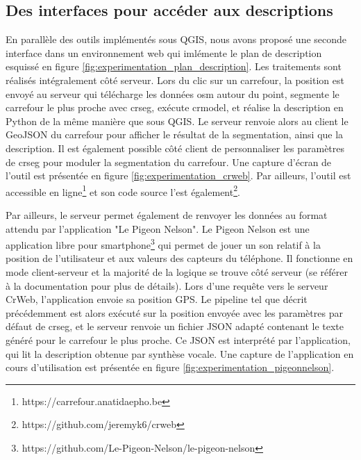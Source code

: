 \subsection{Des interfaces pour accéder aux descriptions}


En parallèle des outils implémentés sous QGIS, nous avons proposé une seconde interface dans un environnement web qui imlémente le plan de description esquissé en figure \ref{fig:experimentation_plan_description}. Les traitements sont réalisés intégralement côté serveur. Lors du clic sur un carrefour, la position est envoyé au serveur qui télécharge les données \gls{osm} autour du point, segmente le carrefour le plus proche avec crseg, exécute crmodel, et réalise la description en Python de la même manière que sous QGIS. Le serveur renvoie alors au client le GeoJSON du carrefour pour afficher le résultat de la segmentation, ainsi que la description. Il est également possible côté client de personnaliser les paramètres de crseg pour moduler la segmentation du carrefour. Une capture d'écran de l'outil est présentée en figure \ref{fig:experimentation_crweb}. Par ailleurs, l'outil est accessible en ligne\footnote{https://carrefour.anatidaepho.be} et son code source l'est également\footnote{https://github.com/jeremyk6/crweb}.

\newpar{}


Par ailleurs, le serveur permet également de renvoyer les données au format attendu par l'application "Le Pigeon Nelson". Le Pigeon Nelson est une application libre pour smartphone\footnote{https://github.com/Le-Pigeon-Nelson/le-pigeon-nelson} qui permet de jouer un son relatif à la position de l'utilisateur et aux valeurs des capteurs du téléphone. Il fonctionne en mode client-serveur et la majorité de la logique se trouve côté serveur (se référer à la documentation pour plus de détails). Lors d'une requête vers le serveur CrWeb, l'application envoie sa position GPS. Le pipeline tel que décrit précédemment est alors exécuté sur la position envoyée avec les paramètres par défaut de crseg, et le serveur renvoie un fichier JSON adapté contenant le texte généré pour le carrefour le plus proche. Ce JSON est interprété par l'application, qui lit la description obtenue par synthèse vocale. Une capture de l'application en cours d'utilisation est présentée en figure \ref{fig:experimentation_pigeonnelson}.

